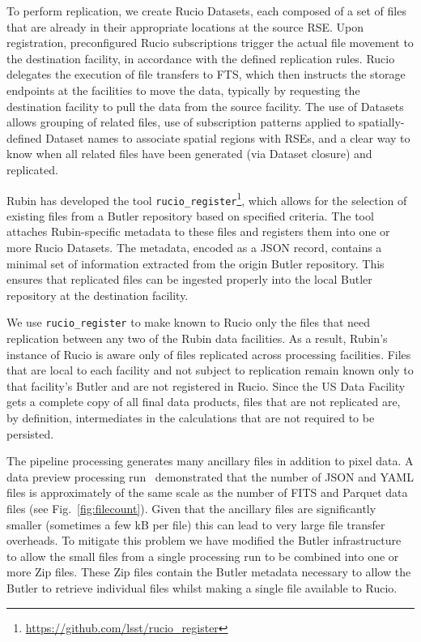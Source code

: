 \documentclass{webofc}
\begin{document}
To perform replication, we create Rucio Datasets, each composed of a set of files that are already in their appropriate locations at the source RSE. Upon registration, preconfigured Rucio subscriptions trigger the actual file movement to the destination facility, in accordance with the defined replication rules. Rucio delegates the execution of file transfers to FTS, which then instructs the storage endpoints at the facilities to move the data, typically by requesting the destination facility to pull the data from the source facility. The use of Datasets allows grouping of related files, use of subscription patterns applied to spatially-defined Dataset names to associate spatial regions with RSEs, and a clear way to know when all related files have been generated (via Dataset closure) and replicated.

Rubin has developed the tool \texttt{rucio\_register}\footnote{\url{https://github.com/lsst/rucio_register}}, which allows for the selection of existing files from a Butler repository based on specified criteria. The tool attaches Rubin-specific metadata to these files and registers them into one or more Rucio Datasets. The metadata, encoded as a JSON record, contains a minimal set of information extracted from the origin Butler repository. This ensures that replicated files can be ingested properly into the local Butler repository at the destination facility.

We use \texttt{rucio\_register} to make known to Rucio only the files that need replication between any two of the Rubin data facilities. As a result, Rubin's instance of Rucio is aware only of files replicated across processing facilities. Files that are local to each facility and not subject to replication remain known only to that facility's Butler and are not registered in Rucio. Since the US Data Facility gets a complete copy of all final data products, files that are not replicated are, by definition,  intermediates in the calculations that are not required to be persisted.

The pipeline processing generates many ancillary files in addition to pixel data.
A data preview processing run\ \cite{10.1051/epjconf/20242950404} demonstrated that the number of JSON and YAML files is approximately of the same scale as the number of FITS and Parquet data files (see Fig.\ \ref{fig:filecount}).
Given that the ancillary files are significantly smaller (sometimes a few kB per file) this can lead to very large file transfer overheads.
To mitigate this problem we have modified the Butler infrastructure to allow the small files from a single processing run to be combined into one or more Zip files.
These Zip files contain the Butler metadata necessary to allow the Butler to retrieve individual files whilst making a single file available to Rucio.
\end{document}

